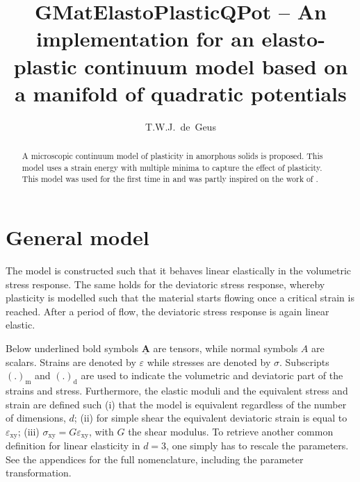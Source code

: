 \documentclass[times,namecite]{goose-article}
\title{%
  GMatElastoPlasticQPot -- An implementation for an elasto-plastic continuum model based on a manifold of quadratic potentials
}
\author{T.W.J.~de~Geus}
\newcommand\T[1]{\underline{\bm{{#1}}}}
\begin{document}
\maketitle

\begin{abstract}
\noindent
A microscopic continuum model of plasticity in amorphous solids is proposed. This model uses a strain energy with multiple minima to capture the effect of plasticity. This model was used for the first time in \citet{DeGeus2018} and was partly inspired on the work of \citet{Jagla2017}.

\end{abstract}

\setcounter{tocdepth}{3}
\tableofcontents

\vfill\newpage
\section{General model}

The model is constructed such that it behaves linear elastically in the volumetric stress response. The same holds for the deviatoric stress response, whereby plasticity is modelled such that the material starts flowing once a critical strain is reached. After a period of flow, the deviatoric stress response is again linear elastic.

Below underlined bold symbols $\T{A}$ are tensors, while normal symbols $A$ are scalars. Strains are denoted by $\varepsilon$ while stresses are denoted by $\sigma$. Subscripts $(.)_\mathrm{m}$ and $(.)_\mathrm{d}$ are used to indicate the volumetric and deviatoric part of the strains and stress. Furthermore, the elastic moduli and the equivalent stress and strain are defined such (i) that the model is equivalent regardless of the number of dimensions, $d$; (ii) for simple shear the equivalent deviatoric strain is equal to $\varepsilon_\mathrm{xy}$; (iii) $\sigma_\mathrm{xy} = G \varepsilon_\mathrm{xy}$, with $G$ the shear modulus. To retrieve another common definition for linear elasticity in $d = 3$, one simply has to rescale the parameters. See the appendices for the full nomenclature, including the parameter transformation.
\end{document}
